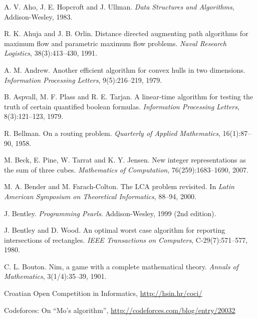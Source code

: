 \begin{thebibliography}{9}
    A. V. Aho, J. E. Hopcroft and J. Ullman.
    \emph{Data Structures and Algorithms},
    Addison-Wesley, 1983.

    R. K. Ahuja and J. B. Orlin.
    Distance directed augmenting path algorithms for maximum flow and parametric maximum flow problems.
    \emph{Naval Research Logistics}, 38(3):413--430, 1991.

    A. M. Andrew.
    Another efficient algorithm for convex hulls in two dimensions.
    \emph{Information Processing Letters}, 9(5):216--219, 1979.

    B. Aspvall, M. F. Plass and R. E. Tarjan.
    A linear-time algorithm for testing the truth of certain quantified boolean formulas.
    \emph{Information Processing Letters}, 8(3):121--123, 1979.

    R. Bellman.
    On a routing problem.
    \emph{Quarterly of Applied Mathematics}, 16(1):87--90, 1958.

    M. Beck, E. Pine, W. Tarrat and K. Y. Jensen.
    New integer representations as the sum of three cubes.
    \emph{Mathematics of Computation}, 76(259):1683--1690, 2007.

    M. A. Bender and M. Farach-Colton.
    The LCA problem revisited. In
    \emph{Latin American Symposium on Theoretical Informatics}, 88--94, 2000.

    J. Bentley.
    \emph{Programming Pearls}.
    Addison-Wesley, 1999 (2nd edition).

    J. Bentley and D. Wood.
    An optimal worst case algorithm for reporting intersections of rectangles.
    \emph{IEEE Transactions on Computers}, C-29(7):571--577, 1980.

    C. L. Bouton.
    Nim, a game with a complete mathematical theory.
    \emph{Annals of Mathematics}, 3(1/4):35--39, 1901.


    Croatian Open Competition in Informatics, \url{http://hsin.hr/coci/}

    Codeforces: On ``Mo's algorithm'',
    \url{http://codeforces.com/blog/entry/20032}


\end{thebibliography}

